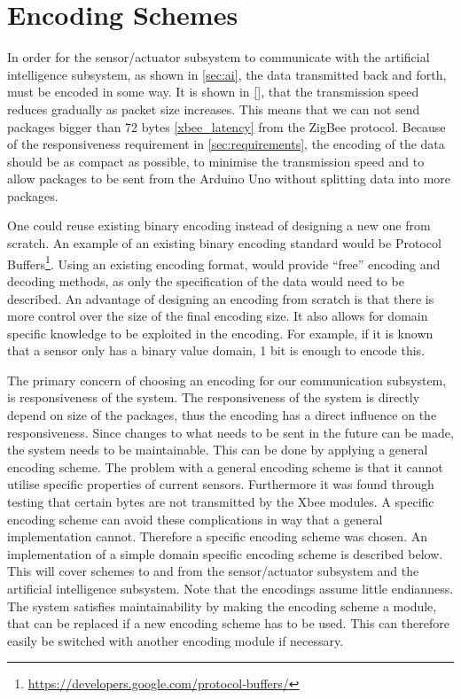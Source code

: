\section{Encoding Schemes}
\label{sec:encoding}
In order for the sensor/actuator subsystem to communicate with the artificial intelligence subsystem, as shown in \cref{sec:ai}, the data transmitted back and forth, must be encoded in some way. It is shown in \cref{}, that the transmission speed reduces gradually as packet size increases. This means that we can not send packages bigger than 72 bytes \cref{xbee_latency} from the ZigBee protocol. Because of the responsiveness requirement in \cref{sec:requirements}, the encoding of the data should be as compact as possible, to minimise the transmission speed and to allow packages to be sent from the Arduino Uno without splitting data into more packages.

One could reuse existing binary encoding instead of designing a new one from scratch. An example of an existing binary encoding standard would be Protocol Buffers\footnote{\url{https://developers.google.com/protocol-buffers/}}. Using an existing encoding format, would provide \enquote{free} encoding and decoding methods, as only the specification of the data would need to be described. An advantage of designing an encoding from scratch is that there is more control over the size of the final encoding size. It also allows for domain specific knowledge to be exploited in the encoding. For example, if it is known that a sensor only has a binary value domain, 1 bit is enough to encode this.

The primary concern of choosing an encoding for our communication subsystem, is responsiveness of the system.
The responsiveness of the system is directly depend on size of the packages, thus the encoding has a direct influence on the responsiveness. Since changes to what needs to be sent in the future can be made, the system needs to be maintainable. This can be done by applying a general encoding scheme. The problem with a general encoding scheme is that it cannot utilise specific properties of current sensors. Furthermore it was found through testing that certain bytes are not transmitted by the Xbee modules. A specific encoding scheme can avoid these complications in way that a general implementation cannot. Therefore a specific encoding scheme was chosen. An implementation of a simple domain specific encoding scheme is described below. This will cover schemes to and from the sensor/actuator subsystem and the artificial intelligence subsystem. Note that the encodings assume little endianness. The system satisfies maintainability by making the encoding scheme a module, that can be replaced if a new encoding scheme has to be used. This can therefore easily be switched with another encoding module if necessary.

